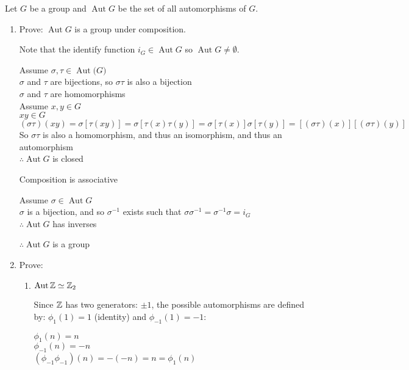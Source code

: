 \documentclass[letterpaper,12pt,fleqn]{article}
\newcommand{\p}{\phi}
\newcommand{\aut}[1]{\operatorname{Aut}{#1}}
\renewcommand{\o}{\sigma}
\renewcommand{\t}{\tau}
\newcommand{\iso}{\simeq}
\begin{document}
Let $G$ be a group and $\aut{G}$ be the set of all automorphisms of $G$.
\begin{enumerate}[label=\alph*)]
\item Prove: $\aut{G}$ is a group under composition.

  Note that the identify function $i_G\in\aut{G}$ so $\aut{G}\ne\emptyset$.

  Assume $\o,\t\in\aut(G)$ \\
  $\o$ and $\t$ are bijections, so $\o\t$ is also a bijection \\
  $\o$ and $\t$ are homomorphisms \\
  Assume $x,y\in G$ \\
  $xy\in G$ \\
  $(\o\t)(xy)=\o[\t(xy)]=\o[\t(x)\t(y)]=\o[\t(x)]\o[\t(y)]=
  [(\o\t)(x)][(\o\t)(y)]$ \\
  So $\o\t$ is also a homomorphism, and thus an isomorphism, and thus an
  automorphism \\
  $\therefore\aut{G}$ is closed

  Composition is associative

  Assume $\o\in\aut{G}$ \\
  $\o$ is a bijection, and so $\o^{-1}$ exists such that
  $\o\o^{-1}=\o^{-1}\o=i_G$ \\
  $\therefore\aut{G}$ has inverses

  $\therefore\aut{G}$ is a group

\item Prove:
  \begin{enumerate}[label=\arabic*)]
  \item $\aut{\Z}\iso\Z_2$

    Since $\mathbb{Z}$ has two generators: $\pm1$, the possible automorphisms are
    defined by: $\p_1(1)=1$ (identity) and $\p_{-1}(1)=-1$:
    
    $\p_1(n)=n$ \\
    $\p_{-1}(n)=-n$ \\
    $(\p_{-1}\p_{-1})(n)=-(-n)=n=\p_1(n)$


\end{enumerate}
\end{enumerate}
\end{document}
